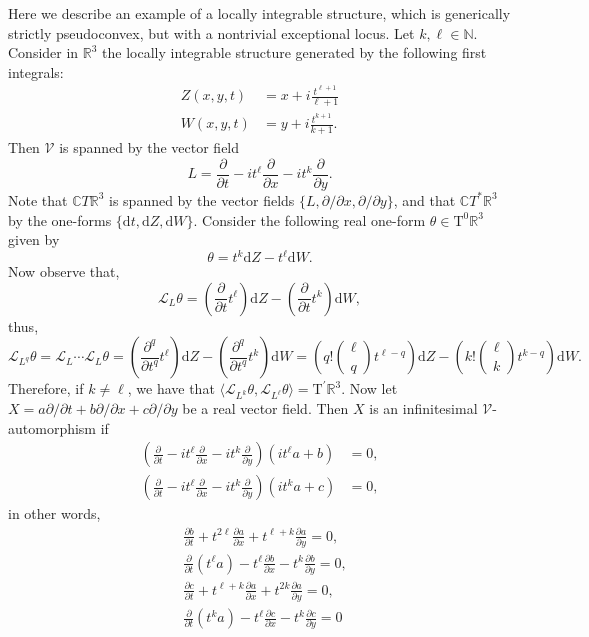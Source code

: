 \documentclass[11pt]{amsart}
\theoremstyle{definition}
\theoremstyle{remark}
\theoremstyle{plain}
\begin{document}
Here we describe an example of a locally integrable structure, which is generically strictly
pseudoconvex, but with a nontrivial exceptional locus.  
Let $k , \ell \in \mathbb{N}$. Consider in $\mathbb{R}^3$ the locally integrable structure generated by the following first integrals:
%
\begin{align*}
	Z(x,y,t) & = x + i \frac{t^{\ell+ 1}}{\ell + 1} \\
	W(x,y,t) & = y + i \frac{t^{k + 1}}{k + 1}.  
\end{align*}
%
Then $\mathcal{V}$ is spanned by the vector field 
%
\[
	L = \frac{\partial}{\partial t} - i t^\ell \frac{\partial}{\partial x} - i t^k \frac{\partial}{\partial y}.
\]
%
Note that $\mathbb{C} T \mathbb{R}^3$ is spanned by the vector fields $\{L, \partial / \partial x, \partial / \partial y\}$, and that  $\mathbb{C} T^* \mathbb{R}^3$ by the one-forms $\{\mathrm{d}t, \mathrm{d} Z, \mathrm{d} W \}$.  Consider the following real one-form $\theta \in \mathrm{T}^0 \mathbb{R}^3$ given by
%
\[
	\theta = t^k \mathrm{d} Z - t^\ell \mathrm{d} W. 
\]
%
Now observe that,
%
\[
	\mathcal{L}_L \theta  =  \left( \frac{\partial}{\partial t} t^\ell \right) \mathrm{d} Z - \left( \frac{\partial}{\partial t} t^k \right) \mathrm{d} W,
\]
%
thus,
%
\[
	\mathcal{L}_{L^q} \theta = \mathcal{L}_L \cdots \mathcal{L}_L \theta =   \left( \frac{\partial^q}{\partial t^q} t^\ell \right) \mathrm{d} Z - \left( \frac{\partial^q}{\partial t^q} t^k \right) \mathrm{d} W =  \left(q! \binom{\ell}{q} t^{\ell-q} \right) \mathrm{d} Z - \left( k! \binom{\ell}{k} t^{k-q} \right) \mathrm{d} W.
\]
%
Therefore, if $k \neq \ell$, we have that $\langle \mathcal{L}_{L^k} \theta, \mathcal{L}_{L^\ell} \theta \rangle = \mathrm{T}^\prime \mathbb{R}^3$. Now let $X = a \partial / \partial t + b \partial / \partial x + c \partial / \partial y$ be a real vector field. Then $X$ is an infinitesimal $\mathcal{V}$-automorphism if
%
\begin{align*}
	\left(\frac{\partial}{\partial t} - i t^\ell \frac{\partial}{\partial x} - i t^k \frac{\partial}{\partial y}\right)\left(i t^\ell a + b \right) & = 0, \\
	\left(\frac{\partial}{\partial t} - i t^\ell \frac{\partial}{\partial x} - i t^k \frac{\partial}{\partial y}\right)\left(i t^k a + c \right) & = 0,
\end{align*}
%
in other words,
%
\begin{align*}
	& \frac{\partial b}{\partial t}  + t^{2\ell} \frac{\partial a}{\partial x} + t^{\ell + k} \frac{\partial a}{\partial y}  = 0,\\
	 &\frac{\partial}{\partial t} (t^\ell a) - t^\ell \frac{\partial b}{\partial x} - t^k \frac{\partial b}{\partial y}  = 0, \\
	&\frac{\partial c}{\partial t}  + t^{\ell + k} \frac{\partial a}{\partial x} + t^{2 k} \frac{\partial a}{\partial y} = 0, \\
	 &\frac{\partial}{\partial t} (t^k a) - t^\ell \frac{\partial c}{\partial x} - t^k \frac{\partial c}{\partial y}  = 0 \\
\end{align*}
\end{document}
